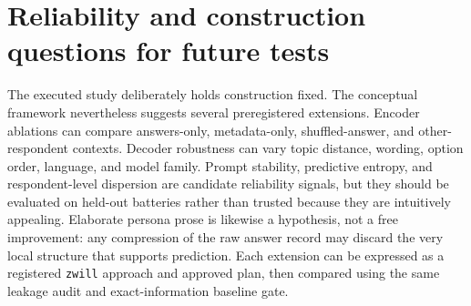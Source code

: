 \documentclass[11pt]{article}
\newcommand{\zwill}{\texttt{zwill}}
\begin{document}
\section{Reliability and construction questions for future tests}
The executed study deliberately holds construction fixed. The conceptual
framework nevertheless suggests several preregistered extensions. Encoder
ablations can compare answers-only, metadata-only, shuffled-answer, and other-
respondent contexts. Decoder robustness can vary topic distance, wording,
option order, language, and model family. Prompt stability, predictive entropy,
and respondent-level dispersion are candidate reliability signals, but they
should be evaluated on held-out batteries rather than trusted because they are
intuitively appealing. Elaborate persona prose is likewise a hypothesis, not a
free improvement: any compression of the raw answer record may discard the
very local structure that supports prediction. Each extension can be expressed
as a registered \zwill{} approach and approved plan, then compared using the same
leakage audit and exact-information baseline gate.



\end{document}
